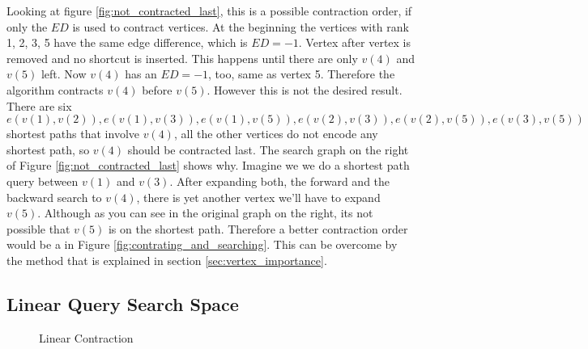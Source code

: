 Looking at figure \ref{fig:not_contracted_last}, this is a possible contraction order, if only the $ED$ is used to contract vertices. At the beginning the vertices with rank 1, 2, 3, 5 have the same edge difference, which is $ED = -1$. Vertex after vertex is removed  and  no shortcut is inserted. This happens until there are only $v(4)$ and $v(5)$ left. Now $v(4)$ has an $ED=-1$, too, same as vertex 5. Therefore the algorithm contracts $v(4)$ before $v(5)$. However this is not the desired result. There are six \\$e(v(1),v(2)), e(v(1),v(3)), e(v(1),v(5)), e(v(2),v(3)), e(v(2),v(5)), e(v(3),v(5))$  shortest paths that involve  $v(4)$, all the other vertices do not encode any shortest path, so $v(4)$ should be contracted last. The search graph on the right of Figure \ref{fig:not_contracted_last} shows why. Imagine we we do a shortest path query between $v(1)$ and $v(3)$. After expanding both, the forward and the backward search to $v(4)$, there is yet another vertex we'll have to expand $v(5)$. Although 
as you can see in the original graph on the right, its not possible that $v(5)$ is on the shortest path. Therefore a better contraction order would be a in Figure \ref{fig:contrating_and_searching}.  This can be overcome by the method that is explained in section \ref{sec:vertex_importance}.

\subsection{Linear Query Search Space}\label{sec:linear_query}

\begin{figure}
\centering

\caption{Linear Contraction}
\label{fig:linear_contraction}
\end{figure}

